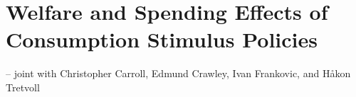 \chapter[Welfare and Spending Effects of Consumption Stimulus Policies]{Welfare and Spending Effects of Consumption Stimulus Policies\raisebox{.3\baselineskip}{\normalsize\footnotemark}}
\begin{flushright}
{\large -- joint with Christopher Carroll, Edmund Crawley, Ivan Frankovic, and H{\aa}kon Tretvoll}\end{flushright}
